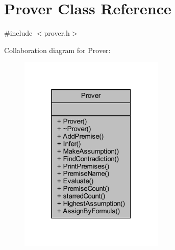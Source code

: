 \hypertarget{classProver}{}\section{Prover Class Reference}
\label{classProver}


{\ttfamily \#include $<$prover.\+h$>$}



Collaboration diagram for Prover\+:
\nopagebreak
\begin{figure}[H]
\begin{center}
\leavevmode
\includegraphics[width=196pt]{classProver__coll__graph}
\end{center}
\end{figure}
